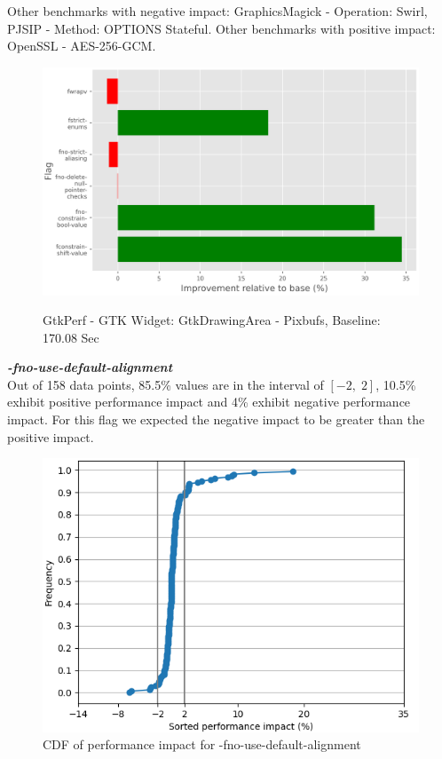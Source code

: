 \documentclass{sciposter}
\begin{document}
\begin{multicols}{3}
Other benchmarks with negative impact: GraphicsMagick - Operation: Swirl, PJSIP
- Method: OPTIONS Stateful. Other benchmarks with positive impact: OpenSSL -
AES-256-GCM.

\begin{figure}[h!]
\centering
\includegraphics[scale=1.3]{gtkperf} \\
\caption{GtkPerf - GTK Widget: GtkDrawingArea - Pixbufs, Baseline: 170.08 Sec}
\label{fig:gtkperf}
\end{figure}

\textbf{\textit{-fno-use-default-alignment}} \\
Out of 158 data points, 85.5\% values are in the interval of \( [-2,\;2] \), 
10.5\% exhibit positive performance impact and 4\% exhibit negative
performance impact. For this flag we expected the negative impact to be greater
than the positive impact.

\begin{figure}[h!]
\centering
\includegraphics[scale=1.2]{fno-use-default-alignment}
\caption{CDF of performance impact for -fno-use-default-alignment}
\end{figure}


\end{multicols}
\end{document}
